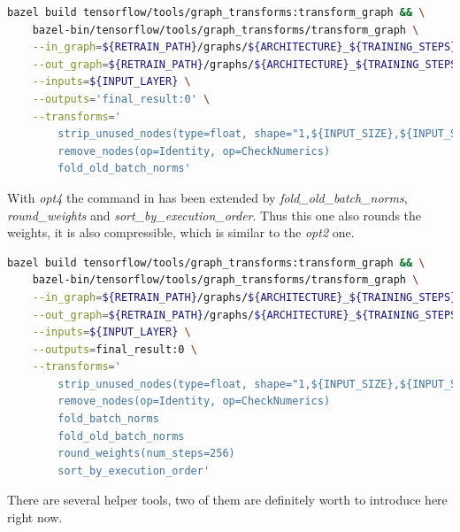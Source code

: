 \begin{minipage}{\linewidth}
\begin{lstlisting}[caption=Build and call of \textit{transform_graph}, label=list:transform_graph_opt3, language=bash]
	bazel build tensorflow/tools/graph_transforms:transform_graph && \
	bazel-bin/tensorflow/tools/graph_transforms/transform_graph \
	--in_graph=${RETRAIN_PATH}/graphs/${ARCHITECTURE}_${TRAINING_STEPS}/retrained_dog_graph_${ARCHITECTURE}_${TRAINING_STEPS}_${LEARNING_RATE}.pb \
	--out_graph=${RETRAIN_PATH}/graphs/${ARCHITECTURE}_${TRAINING_STEPS}/opt3_retrained_dog_graph_${ARCHITECTURE}_${TRAINING_STEPS}_${LEARNING_RATE}.pb \
	--inputs=${INPUT_LAYER} \
	--outputs='final_result:0' \
	--transforms='
		strip_unused_nodes(type=float, shape="1,${INPUT_SIZE},${INPUT_SIZE},3")
		remove_nodes(op=Identity, op=CheckNumerics)
		fold_old_batch_norms'
\end{lstlisting}
\end{minipage}

With \textit{opt4} the command in \listref{transform_graph_opt4} has been extended by \textit{fold_old_batch_norms}, \textit{round_weights} and \textit{sort_by_execution_order}. Thus this one also rounds the weights, it is also compressible, which is similar to the \textit{opt2} one. 

\begin{minipage}{\linewidth}
\begin{lstlisting}[caption=Build and call of \textit{transform_graph}, label=list:transform_graph_opt4, language=bash]
	bazel build tensorflow/tools/graph_transforms:transform_graph && \
	bazel-bin/tensorflow/tools/graph_transforms/transform_graph \
	--in_graph=${RETRAIN_PATH}/graphs/${ARCHITECTURE}_${TRAINING_STEPS}/retrained_dog_graph_${ARCHITECTURE}_${TRAINING_STEPS}_${LEARNING_RATE}.pb \
	--out_graph=${RETRAIN_PATH}/graphs/${ARCHITECTURE}_${TRAINING_STEPS}/opt4_retrained_dog_graph_${ARCHITECTURE}_${TRAINING_STEPS}_${LEARNING_RATE}.pb \
	--inputs=${INPUT_LAYER} \
	--outputs=final_result:0 \
	--transforms=' 
		strip_unused_nodes(type=float, shape="1,${INPUT_SIZE},${INPUT_SIZE},3")
		remove_nodes(op=Identity, op=CheckNumerics) 
		fold_batch_norms 
		fold_old_batch_norms 
		round_weights(num_steps=256)
		sort_by_execution_order'
\end{lstlisting}
\end{minipage}


There are several helper tools, two of them are definitely worth to introduce here right now. \\

